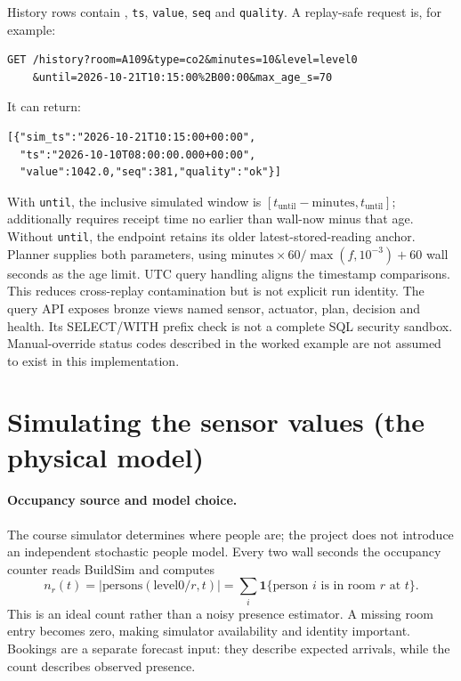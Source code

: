 \documentclass[11pt,a4paper]{article}
\begin{document}
History rows contain \protect{}, \texttt{ts}, \texttt{value}, \texttt{seq} and \texttt{quality}. A replay-safe request is, for example:
{\small\begin{verbatim}
GET /history?room=A109&type=co2&minutes=10&level=level0
    &until=2026-10-21T10:15:00%2B00:00&max_age_s=70
\end{verbatim}}
It can return:
{\small\begin{verbatim}
[{"sim_ts":"2026-10-21T10:15:00+00:00",
  "ts":"2026-10-10T08:00:00.000+00:00",
  "value":1042.0,"seq":381,"quality":"ok"}]
\end{verbatim}}
With \texttt{until}, the inclusive simulated window is $[t_{\mathrm{until}}-\mathrm{minutes},t_{\mathrm{until}}]$; \protect{} additionally requires receipt time no earlier than wall-now minus that age. Without \texttt{until}, the endpoint retains its older latest-stored-reading anchor. Planner supplies both parameters, using $\mathrm{minutes}\times60/\max(f,10^{-3})+60$ wall seconds as the age limit. UTC query handling aligns the timestamp comparisons. This reduces cross-replay contamination but is not explicit run identity. The query API exposes bronze views named sensor, actuator, plan, decision and health. Its SELECT/WITH prefix check is not a complete SQL security sandbox. Manual-override status codes described in the worked example are not assumed to exist in this implementation.

\section{Simulating the sensor values (the physical model)}
\paragraph{Occupancy source and model choice.}
The course simulator determines where people are; the project does not introduce an independent stochastic people model. Every two wall seconds the occupancy counter reads BuildSim and computes
\begin{equation}
n_r(t)=|\mathrm{persons}(\mathrm{level0}/r,t)|
=\sum_i\mathbf1\{\text{person }i\text{ is in room }r\text{ at }t\}.
\end{equation}
This is an ideal count rather than a noisy presence estimator. A missing room entry becomes zero, making simulator availability and identity important. Bookings are a separate forecast input: they describe expected arrivals, while the count describes observed presence.
\end{document}

